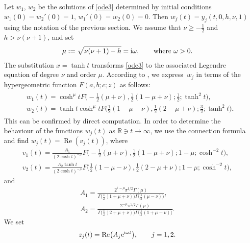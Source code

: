 \documentclass[pdftex]{sigma}
\newcommand{\R}{\mathbb{R}}
\numberwithin{equation}{section}
\begin{document}
Let $w_1$, $w_2$ be the solutions of \eqref{ode3} determined by initial conditions
$w_1(0)=w_2'(0)=1$, $w_1'(0)=w_2(0)=0$. Then $w_j(t)=y_j(t,0,h,\nu,1)$ using the notation of the previous section.
We assume that $\nu\ge -\frac12$ and $h>\nu(\nu+1)$, and set
\begin{equation}\label{omega}
 \mu:=\sqrt{\nu(\nu+1)-h}={\rm i}\omega,\qquad\text{where $\omega>0$}.
\end{equation}
The substitution $x=\tanh t$ transforms \eqref{ode3} to the associated Legendre equation \cite[formula~(14.2.2)]{dlmf}
of degree $\nu$ and order $\mu$. According to \cite[Section~5, formula~(15.09)]{O}, we
express~$w_j$ in terms of the hypergeometric function $F(a,b;c;z)$ as follows:
\begin{gather*}
\begin{split}
&w_1(t) = \cosh^\mu tF\bigl(-\tfrac12(\mu+\nu),\tfrac12(1-\mu+\nu);\tfrac12;\tanh^2 t\bigr),\\
&w_2(t) = \tanh t\cosh^\mu t F\bigl(\tfrac12(1-\mu-\nu),\tfrac12(2-\mu+\nu);\tfrac32;\tanh^2 t\bigr).
\end{split}
\end{gather*}
This can be confirmed by direct computation.
In order to determine the behaviour of the functions $w_j(t)$ as $\R\ni t\to\infty$, we use the connection formula \cite[formula~(15.8.4)]{dlmf} and find
$w_j(t)=\operatorname{Re}(v_j(t))$, where
\begin{gather*}
v_1(t) = \frac{A_1}{(2\cosh t)^{-\mu}}F\bigl(-\tfrac12(\mu+\nu),\tfrac12(1-\mu+\nu);1-\mu;\cosh^{-2} t\bigr),\\%
v_2(t) = \frac{A_2\tanh t}{(2\cosh t)^{-\mu}}F\bigl(\tfrac12(1-\mu-\nu),\tfrac12(2-\mu+\nu);1-\mu;\cosh^{-2} t\bigr),%
\end{gather*}
and
\begin{gather*}
A_1 = \frac{2^{1-\mu}\pi^{1/2}\Gamma(\mu)}{\Gamma\bigl(\tfrac12(1+\mu+\nu)\bigr)\Gamma\bigl(\frac12(\mu-\nu)\bigr)},\\
A_2 = \frac{2^{-\mu} \pi^{1/2}\Gamma(\mu)}{\Gamma\bigl(\tfrac12(2+\mu+\nu)\bigr)\Gamma\bigl(\frac12(1+\mu-\nu)\bigr)}.
\end{gather*}
We set
\[ z_j(t)=\operatorname{Re}\bigl(A_j{\rm e}^{{\rm i}\omega t}\bigr),\qquad j=1,2 .\]
\end{document}
